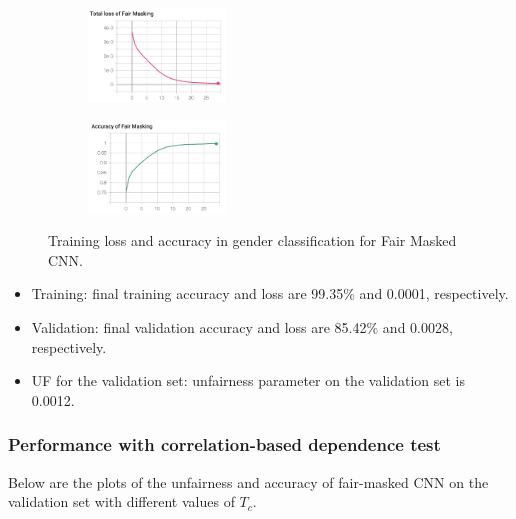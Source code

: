 \begin{figure}[H]
	\centering
	\begin{subfigure}
		\centering
		\includegraphics[width=0.4\textwidth]{figure/fairmasking-loss.png}
	\end{subfigure}
	\quad
	\begin{subfigure}
		\centering
		\includegraphics[width=0.4\textwidth]{figure/fairmasking-ac.png}
	\end{subfigure}
	\caption{Training loss and accuracy in gender classification for Fair Masked CNN.}
	\label{fig: fair masking cnn}
\end{figure}

\begin{itemize}
\item Training: final training accuracy and loss are 99.35$\%$ and 0.0001, respectively.  

\item Validation: final validation accuracy and loss are 85.42$\%$ and 0.0028, respectively.

\item UF for the validation set: unfairness parameter on the validation set is 0.0012.   
\end{itemize}

\subsubsection*{Performance with correlation-based dependence test}
Below are the plots of the unfairness and accuracy of fair-masked CNN on the validation set with different values of $T_c$.

